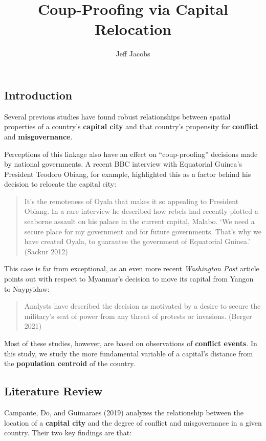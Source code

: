 \documentclass[
  letterpaper,
  DIV=11,
  numbers=noendperiod]{scrartcl}
\title{Coup-Proofing via Capital Relocation}
\author{Jeff Jacobs}
\date{}
\begin{document}
\maketitle


\subsection{Introduction}\label{introduction}

Several previous studies have found robust relationships between spatial
properties of a country's \textbf{capital city} and that country's
propensity for \textbf{conflict} and \textbf{misgovernance}.

Perceptions of this linkage also have an effect on ``coup-proofing''
decisions made by national governments. A recent BBC interview with
Equatorial Guinea's President Teodoro Obiang, for example, highlighted
this as a factor behind his decision to relocate the capital city:

\begin{quote}
It's the remoteness of Oyala that makes it so appealing to President
Obiang. In a rare interview he described how rebels had recently plotted
a seaborne assault on his palace in the current capital, Malabo. `We
need a secure place for my government and for future governments. That's
why we have created Oyala, to guarantee the government of Equatorial
Guinea.' (Sackur 2012)
\end{quote}

This case is far from exceptional, as an even more recent
\emph{Washington Post} article points out with respect to Myanmar's
decision to move its capital from Yangon to Naypyidaw:

\begin{quote}
Analysts have described the decision as motivated by a desire to secure
the military's seat of power from any threat of protests or invasions.
(Berger 2021)
\end{quote}

Most of these studies, however, are based on observations of
\textbf{conflict events}. In this study, we study the more fundamental
variable of a capital's distance from the \textbf{population centroid}
of the country.

\subsection{Literature Review}\label{literature-review}

Campante, Do, and Guimaraes (2019) analyzes the relationship between the
location of a \textbf{capital city} and the degree of conflict and
misgovernance in a given country. Their two key findings are that:
\end{document}
